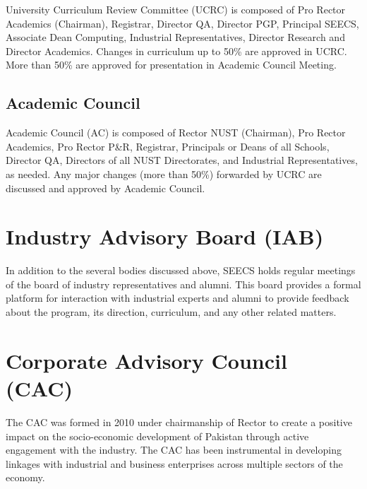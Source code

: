 University Curriculum Review Committee (UCRC) is composed of Pro Rector Academics (Chairman), Registrar, Director QA, Director PGP, Principal SEECS, Associate Dean Computing, Industrial Representatives, Director Research and Director Academics. Changes in curriculum up to 50\% are approved in UCRC. More than 50\% are approved for presentation in Academic Council Meeting.

\subsection{Academic Council}\label{academic-council}

Academic Council (AC) is composed of Rector NUST (Chairman), Pro Rector Academics, Pro Rector P\&R, Registrar, Principals or Deans of all Schools, Director QA, Directors of all NUST Directorates, and Industrial Representatives, as needed. Any major changes (more than 50\%) forwarded by UCRC are discussed and approved by Academic Council.

\section{Industry Advisory Board (IAB)}\label{industry-advisory-board-iab}

In addition to the several bodies discussed above, SEECS holds regular meetings of the board of industry representatives and alumni. This board provides a formal platform for interaction with industrial experts and alumni to provide feedback about the program, its direction, curriculum, and any other related matters.

\section{Corporate Advisory Council (CAC)}\label{corporate-advisory-council-cac}

The CAC was formed in 2010 under chairmanship of Rector to create a positive impact on the socio-economic development of Pakistan through active engagement with the industry. The CAC has been instrumental in developing linkages with industrial and business enterprises across multiple sectors of the economy.



